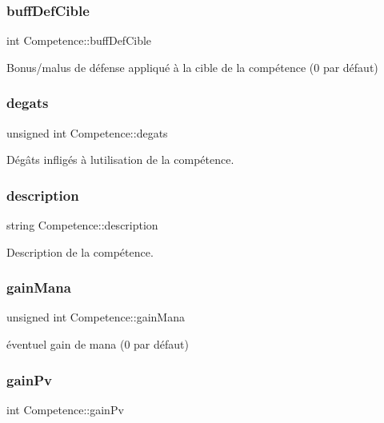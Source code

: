 \subsubsection{\texorpdfstring{buff\+Def\+Cible}{buffDefCible}}
{\footnotesize\ttfamily int Competence\+::buff\+Def\+Cible}

Bonus/malus de défense appliqué à la cible de la compétence (0 par défaut) \mbox{\label{structCompetence_a08f1a4a8857d751f1381f37f9b733263}} 
\subsubsection{\texorpdfstring{degats}{degats}}
{\footnotesize\ttfamily unsigned int Competence\+::degats}

Dégâts infligés à l\textquotesingle{}utilisation de la compétence. \mbox{\label{structCompetence_a532f766c2ba47850ccde304c0d232fae}} 
\subsubsection{\texorpdfstring{description}{description}}
{\footnotesize\ttfamily string Competence\+::description}

Description de la compétence. \mbox{\label{structCompetence_ae7c7bdb44563e2f93cf462bf4b096080}} 
\subsubsection{\texorpdfstring{gain\+Mana}{gainMana}}
{\footnotesize\ttfamily unsigned int Competence\+::gain\+Mana}

éventuel gain de mana (0 par défaut) \mbox{\label{structCompetence_a04e2023a681e6862535ed586b3f4f252}} 
\subsubsection{\texorpdfstring{gain\+Pv}{gainPv}}
{\footnotesize\ttfamily int Competence\+::gain\+Pv}

